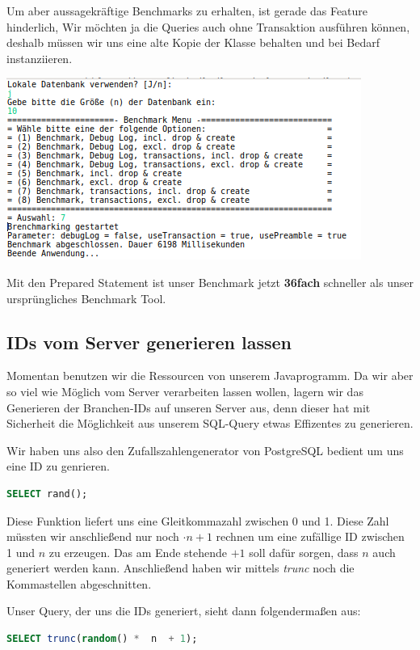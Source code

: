 Um aber aussagekräftige Benchmarks zu erhalten, ist gerade das Feature
hinderlich, Wir möchten ja die Queries auch ohne Transaktion ausführen können,
deshalb müssen wir uns eine alte Kopie der Klasse behalten und bei Bedarf
instanziieren.
\begin{center}
\includegraphics[scale=0.8]{Bilder/Auswahl_016.png}
\end{center}
Mit den Prepared Statement ist unser Benchmark jetzt \textbf{36fach} schneller
als unser ursprüngliches Benchmark Tool.

\subsection{IDs vom Server generieren lassen}
Momentan benutzen wir die Ressourcen von unserem Javaprogramm. Da wir aber so
viel wie Möglich vom Server verarbeiten lassen wollen, lagern wir das Generieren
der Branchen-IDs auf unseren Server aus, denn dieser hat mit Sicherheit die
Möglichkeit aus unserem SQL-Query etwas Effizentes zu generieren.

Wir haben uns also den Zufallszahlengenerator von PostgreSQL bedient um uns
eine ID zu genrieren.
\begin{lstlisting}[language=sql]
SELECT rand();
\end{lstlisting}

Diese Funktion liefert uns eine Gleitkommazahl zwischen 0 und 1. Diese Zahl
müssten wir anschließend nur noch $ \cdot  n + 1 $ rechnen um eine zufällige ID
zwischen 1 und $n$ zu erzeugen. Das am Ende stehende $ + 1$ soll dafür sorgen,
dass $n$ auch generiert werden kann. Anschließend haben wir mittels \textit{trunc} noch
die Kommastellen abgeschnitten.

Unser Query, der uns die IDs generiert, sieht dann folgendermaßen aus:
\begin{lstlisting}[language=sql]
SELECT trunc(random() *  n  + 1);
\end{lstlisting}

